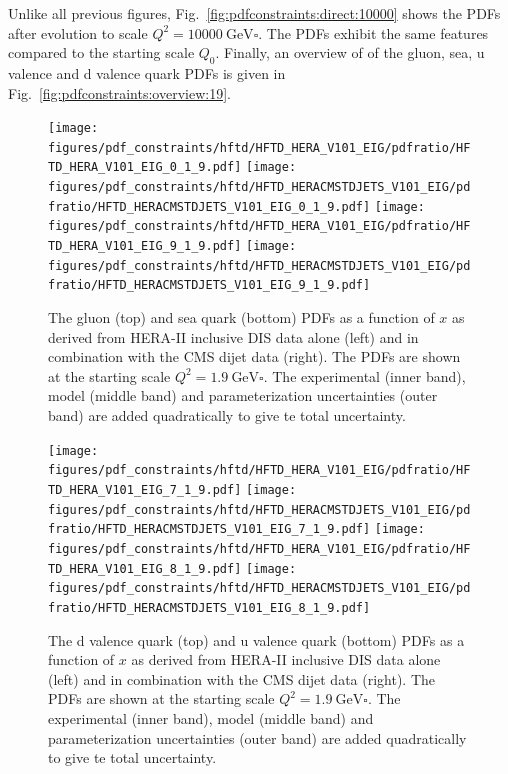 Unlike all previous figures, Fig.~\ref{fig:pdfconstraints:direct:10000} shows
the PDFs after evolution to scale $Q^2 = \SI{10000}{\GeV \square}$. The PDFs
exhibit the same features compared to the starting scale $Q_0$. Finally, an
overview of of the gluon, sea, u valence and d valence quark PDFs is given in
Fig.~\ref{fig:pdfconstraints:overview:19}.   

\begin{figure}[tbp]
  \centering
  \texttt{[image: figures/pdf\_constraints/hftd/HFTD\_HERA\_V101\_EIG/pdfratio/HFTD\_HERA\_V101\_EIG\_0\_1\_9.pdf]}\hfill%
  \texttt{[image: figures/pdf\_constraints/hftd/HFTD\_HERACMSTDJETS\_V101\_EIG/pdfratio/HFTD\_HERACMSTDJETS\_V101\_EIG\_0\_1\_9.pdf]}
  \texttt{[image: figures/pdf\_constraints/hftd/HFTD\_HERA\_V101\_EIG/pdfratio/HFTD\_HERA\_V101\_EIG\_9\_1\_9.pdf]}\hfill%
  \texttt{[image: figures/pdf\_constraints/hftd/HFTD\_HERACMSTDJETS\_V101\_EIG/pdfratio/HFTD\_HERACMSTDJETS\_V101\_EIG\_9\_1\_9.pdf]}
  \caption[The gluon and sea quark PDFs]{The gluon (top) and sea quark (bottom) PDFs as a function of $x$ as
  derived from HERA-II inclusive DIS data alone (left) and in combination with
  the CMS dijet data (right). The PDFs are shown at the starting scale $Q^2 =
  \SI{1.9}{\GeV \square}$. The experimental (inner band), model (middle band)
  and parameterization uncertainties (outer band) are added quadratically to give
  te total uncertainty.}
  \label{fig:pdfconstraints:split:gluonqsea:19}
\end{figure}

\begin{figure}[tbp]
  \centering
  \texttt{[image: figures/pdf\_constraints/hftd/HFTD\_HERA\_V101\_EIG/pdfratio/HFTD\_HERA\_V101\_EIG\_7\_1\_9.pdf]}\hfill%
  \texttt{[image: figures/pdf\_constraints/hftd/HFTD\_HERACMSTDJETS\_V101\_EIG/pdfratio/HFTD\_HERACMSTDJETS\_V101\_EIG\_7\_1\_9.pdf]}
  \texttt{[image: figures/pdf\_constraints/hftd/HFTD\_HERA\_V101\_EIG/pdfratio/HFTD\_HERA\_V101\_EIG\_8\_1\_9.pdf]}\hfill%
  \texttt{[image: figures/pdf\_constraints/hftd/HFTD\_HERACMSTDJETS\_V101\_EIG/pdfratio/HFTD\_HERACMSTDJETS\_V101\_EIG\_8\_1\_9.pdf]}
  \caption[The d valence and u valence quark PDFs]{The d valence quark (top) and u
    valence quark (bottom) PDFs as a function of $x$ as
  derived from HERA-II inclusive DIS data alone (left) and in combination with
  the CMS dijet data (right). The PDFs are shown at the starting scale $Q^2 =
  \SI{1.9}{\GeV \square}$. The experimental (inner band), model (middle band)
  and parameterization uncertainties (outer band) are added quadratically to give
  te total uncertainty.}
  \label{fig:pdfconstraints:split:dvaluval:19}
\end{figure}


